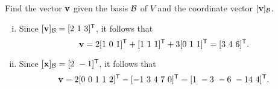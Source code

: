 \begin{example}
\begin{enumerate}[i.]
		\end{enumerate}
	
	\item Find the vector $\mathbf{v}$ given the basis $\mathcal{B}$ of $V$ and the coordinate vector $[\mathbf{v}]_{\mathcal{B}}$.
		\begin{enumerate}[i.]
		\item Since $[\vv]_{\CB} = [2 \ 1 \ 3]^{\tr}$, it follows that 
		\[\vv =  2[1\ 0 \ 1]^{\tr} + [1 \ 1 \ 1]^{\tr} + 3[0 \ 1 \ 1]^{\tr} = [3 \ 4 \ 6]^{\tr}.\]
		
		\item Since $[\vx]_{\CB} = [2 \ -1]^{\tr}$, it follows that 
		\[\vv = 2[0 \ 0 \ 1 \ 1 \ 2]^{\tr} - [-1 \ 3 \ 4 \ 7 \ 0]^{\tr} = [1 \ -3 \ -6 \ -14 \ 4]^{\tr}.\]
		
		\end{enumerate}
	
	\ea
	
\end{example}


